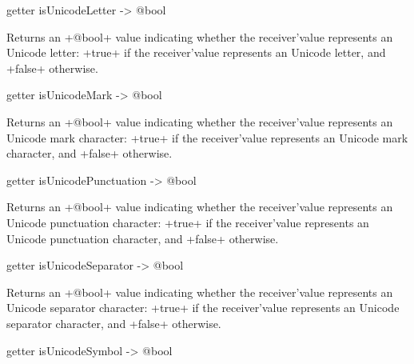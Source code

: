 
\begin{galgas4}
getter isUnicodeLetter -> @bool
\end{galgas4}

Returns an \ggsq+@bool+ value indicating whether the receiver'value represents an Unicode letter: \ggsq+true+ if the receiver'value represents an Unicode letter, and \ggsq+false+ otherwise.







\begin{galgas4}
getter isUnicodeMark -> @bool
\end{galgas4}

Returns an \ggsq+@bool+ value indicating whether the receiver'value represents an Unicode mark character: \ggsq+true+ if the receiver'value represents an Unicode mark character, and \ggsq+false+ otherwise.







\begin{galgas4}
getter isUnicodePunctuation -> @bool
\end{galgas4}

Returns an \ggsq+@bool+ value indicating whether the receiver'value represents an Unicode punctuation character: \ggsq+true+ if the receiver'value represents an Unicode punctuation character, and \ggsq+false+ otherwise.







\begin{galgas4}
getter isUnicodeSeparator -> @bool
\end{galgas4}

Returns an \ggsq+@bool+ value indicating whether the receiver'value represents an Unicode separator character: \ggsq+true+ if the receiver'value represents an Unicode separator character, and \ggsq+false+ otherwise.







\begin{galgas4}
getter isUnicodeSymbol -> @bool
\end{galgas4}

